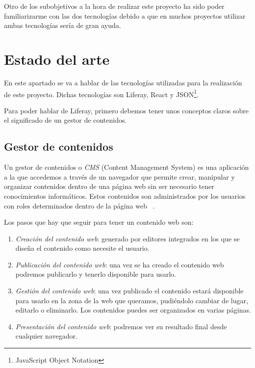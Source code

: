 \documentclass[a4paper, 12pt]{book}
\begin{document}
Otro de los subobjetivos a la hora de realizar este proyecto ha sido poder familiarizarme con las dos tecnologías debido a que en muchos proyectos utilizar ambas tecnologías sería de gran ayuda.


\chapter{Estado del arte} 
\label{sec:estado-del-arte}
En este apartado se va a hablar de las tecnologías utilizadas para la realización de este proyecto. Dichas tecnologías son Liferay, React y JSON\footnote{JavaScript Object Notation}.

Para poder hablar de Liferay, primero debemos tener unos conceptos claros sobre el significado de un gestor de contenidos.

\section{Gestor de contenidos}
\label{subsec:gestor-de-contenidos}
Un gestor de contenidos o \emph{CMS} (Content Management System) es una aplicación a la que accedemos a través de un navegador que permite crear, manipular y organizar contenidos dentro de una página web sin ser necesario tener conocimientos informáticos. Estos contenidos son administrados por los usuarios con roles determinados dentro de la página web ~\cite{cms_tech}.


\vspace{5mm}
Los pasos que hay que seguir para tener un contenido web son: 
\begin{enumerate}
    \item \emph{Creación del contenido web}: generado por editores integrados en los que se diseña el contenido como necesite el usuario.
    \item \emph{Publicación del contenido web}: una vez se ha creado el contenido web podremos publicarlo y tenerlo disponible para usarlo.
    \item \emph{Gestión del contenido web}: una vez publicado el contenido estará disponible para usarlo en la zona de la web que queramos, pudiéndolo cambiar de lugar, editarlo o eliminarlo. Los contenidos puedes ser organizados en varias páginas.
    \item \emph{Presentación del contenido web}: podremos ver su resultado final desde cualquier navegador.
\end{enumerate}
\end{document}
